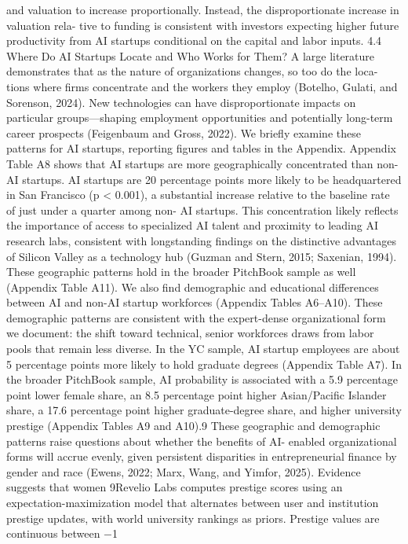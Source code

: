 and valuation to increase proportionally. Instead, the disproportionate increase in valuation rela-
tive to funding is consistent with investors expecting higher future productivity from AI startups
conditional on the capital and labor inputs.
4.4
Where Do AI Startups Locate and Who Works for Them?
A large literature demonstrates that as the nature of organizations changes, so too do the loca-
tions where firms concentrate and the workers they employ (Botelho, Gulati, and Sorenson, 2024).
New technologies can have disproportionate impacts on particular groups—shaping employment
opportunities and potentially long-term career prospects (Feigenbaum and Gross, 2022). We briefly
examine these patterns for AI startups, reporting figures and tables in the Appendix.
Appendix Table A8 shows that AI startups are more geographically concentrated than non-AI
startups. AI startups are 20 percentage points more likely to be headquartered in San Francisco
(p < 0.001), a substantial increase relative to the baseline rate of just under a quarter among non-
AI startups. This concentration likely reflects the importance of access to specialized AI talent
and proximity to leading AI research labs, consistent with longstanding findings on the distinctive
advantages of Silicon Valley as a technology hub (Guzman and Stern, 2015; Saxenian, 1994). These
geographic patterns hold in the broader PitchBook sample as well (Appendix Table A11).
We also find demographic and educational differences between AI and non-AI startup workforces
(Appendix Tables A6–A10).
These demographic patterns are consistent with the expert-dense
organizational form we document: the shift toward technical, senior workforces draws from labor
pools that remain less diverse. In the YC sample, AI startup employees are about 5 percentage
points more likely to hold graduate degrees (Appendix Table A7). In the broader PitchBook sample,
AI probability is associated with a 5.9 percentage point lower female share, an 8.5 percentage point
higher Asian/Pacific Islander share, a 17.6 percentage point higher graduate-degree share, and
higher university prestige (Appendix Tables A9 and A10).9
These geographic and demographic patterns raise questions about whether the benefits of AI-
enabled organizational forms will accrue evenly, given persistent disparities in entrepreneurial finance
by gender and race (Ewens, 2022; Marx, Wang, and Yimfor, 2025). Evidence suggests that women
9Revelio Labs computes prestige scores using an expectation-maximization model that alternates between user and
institution prestige updates, with world university rankings as priors. Prestige values are continuous between −1

